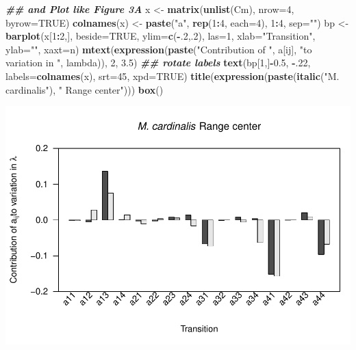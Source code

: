 \documentclass[
]{book}
\newenvironment{Shaded}{\begin{snugshade}}{\end{snugshade}}
\newcommand{\AttributeTok}[1]{\textcolor[rgb]{0.13,0.29,0.53}{#1}}
\newcommand{\ConstantTok}[1]{\textcolor[rgb]{0.56,0.35,0.01}{#1}}
\newcommand{\DecValTok}[1]{\textcolor[rgb]{0.00,0.00,0.81}{#1}}
\newcommand{\DocumentationTok}[1]{\textcolor[rgb]{0.56,0.35,0.01}{\textbf{\textit{#1}}}}
\newcommand{\FloatTok}[1]{\textcolor[rgb]{0.00,0.00,0.81}{#1}}
\newcommand{\FunctionTok}[1]{\textcolor[rgb]{0.13,0.29,0.53}{\textbf{#1}}}
\newcommand{\NormalTok}[1]{#1}
\newcommand{\OtherTok}[1]{\textcolor[rgb]{0.56,0.35,0.01}{#1}}
\newcommand{\SpecialCharTok}[1]{\textcolor[rgb]{0.81,0.36,0.00}{\textbf{#1}}}
\newcommand{\StringTok}[1]{\textcolor[rgb]{0.31,0.60,0.02}{#1}}
\theoremstyle{definition}
\theoremstyle{definition}
\theoremstyle{definition}
\theoremstyle{definition}
\theoremstyle{remark}
\begin{document}
\begin{Shaded}
\begin{Highlighting}[]
\DocumentationTok{\#\# and Plot like Figure 3A}
\NormalTok{x }\OtherTok{\textless{}{-}} \FunctionTok{matrix}\NormalTok{(}\FunctionTok{unlist}\NormalTok{(Cm), }\AttributeTok{nrow=}\DecValTok{4}\NormalTok{, }\AttributeTok{byrow=}\ConstantTok{TRUE}\NormalTok{)}
\FunctionTok{colnames}\NormalTok{(x) }\OtherTok{\textless{}{-}} \FunctionTok{paste}\NormalTok{(}\StringTok{"a"}\NormalTok{, }\FunctionTok{rep}\NormalTok{(}\DecValTok{1}\SpecialCharTok{:}\DecValTok{4}\NormalTok{, }\AttributeTok{each=}\DecValTok{4}\NormalTok{), }\DecValTok{1}\SpecialCharTok{:}\DecValTok{4}\NormalTok{, }\AttributeTok{sep=}\StringTok{""}\NormalTok{)}
\NormalTok{bp }\OtherTok{\textless{}{-}} \FunctionTok{barplot}\NormalTok{(x[}\DecValTok{1}\SpecialCharTok{:}\DecValTok{2}\NormalTok{,], }\AttributeTok{beside=}\ConstantTok{TRUE}\NormalTok{, }\AttributeTok{ylim=}\FunctionTok{c}\NormalTok{(}\SpecialCharTok{{-}}\NormalTok{.}\DecValTok{2}\NormalTok{,.}\DecValTok{2}\NormalTok{), }\AttributeTok{las=}\DecValTok{1}\NormalTok{,}
\AttributeTok{xlab=}\StringTok{"Transition"}\NormalTok{, }\AttributeTok{ylab=}\StringTok{""}\NormalTok{, }\AttributeTok{xaxt=}\StringTok{\textquotesingle{}n\textquotesingle{}}\NormalTok{)}
\FunctionTok{mtext}\NormalTok{(}\FunctionTok{expression}\NormalTok{(}\FunctionTok{paste}\NormalTok{(}\StringTok{"Contribution of "}\NormalTok{, a[ij], }\StringTok{"to variation in "}\NormalTok{, lambda)), }\DecValTok{2}\NormalTok{, }\FloatTok{3.5}\NormalTok{)}
\DocumentationTok{\#\# rotate labels}
\FunctionTok{text}\NormalTok{(bp[}\DecValTok{1}\NormalTok{,]}\SpecialCharTok{{-}}\FloatTok{0.5}\NormalTok{, }\SpecialCharTok{{-}}\NormalTok{.}\DecValTok{22}\NormalTok{, }\AttributeTok{labels=}\FunctionTok{colnames}\NormalTok{(x), }\AttributeTok{srt=}\DecValTok{45}\NormalTok{, }\AttributeTok{xpd=}\ConstantTok{TRUE}\NormalTok{)}
\FunctionTok{title}\NormalTok{(}\FunctionTok{expression}\NormalTok{(}\FunctionTok{paste}\NormalTok{(}\FunctionTok{italic}\NormalTok{(}\StringTok{"M. cardinalis"}\NormalTok{), }\StringTok{" Range center"}\NormalTok{)))}
\FunctionTok{box}\NormalTok{()}
\end{Highlighting}
\end{Shaded}

\includegraphics{Diagnostico_Poblacional_files/figure-latex/unnamed-chunk-24-5.pdf}
\end{document}

